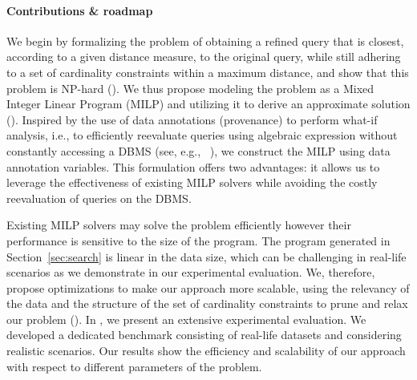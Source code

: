 \paragraph*{Contributions \& roadmap}
We begin by formalizing the \problem{} problem of obtaining a refined query that is closest, according to a given distance measure, to the original query, while still adhering to a set of cardinality constraints within a maximum distance, and show that this problem is {\sf NP-hard} ().
We thus propose modeling the problem as a Mixed Integer Linear Program (MILP) and utilizing it to derive an approximate solution (). Inspired by the use of data annotations (provenance) to perform what-if analysis, i.e., to efficiently reevaluate queries using algebraic expression without constantly accessing a DBMS (see, e.g., ~\cite{DIMT13, BourhisDM16, DeutchMT14, MoskovitchLJ22}), we construct the MILP using data annotation variables. 
This formulation offers two advantages: it allows us to leverage the effectiveness of existing MILP solvers while avoiding the costly reevaluation of queries on the DBMS.

Existing MILP solvers may solve the problem efficiently however their performance is sensitive to the size of the program. The program generated in Section~\ref{sec:search} is linear in the data size, which can be challenging in real-life scenarios as we demonstrate in our experimental evaluation. We, therefore, propose optimizations to make our approach more scalable, using the relevancy of the data and the structure of the set of cardinality constraints to prune and relax our problem (). In , we present an extensive experimental evaluation. We developed a dedicated benchmark consisting of real-life datasets and considering realistic scenarios. Our results show the efficiency and scalability of our approach with respect to different parameters of the problem. 





